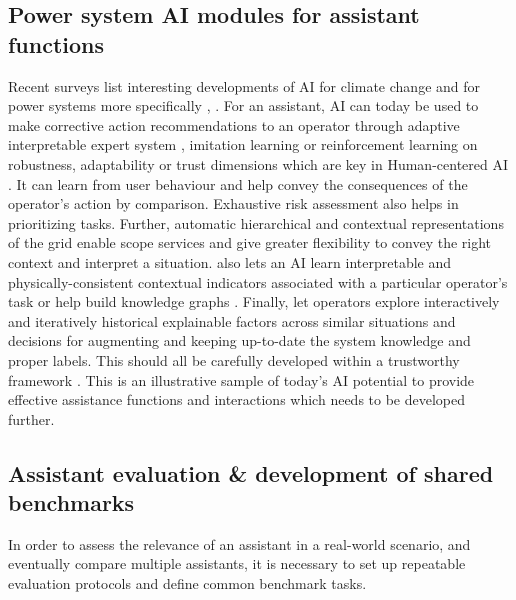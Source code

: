 \documentclass{IOS-Book-Article}
\begin{document}
\subsection{Power system AI modules for assistant functions}\label{sec:AIModules}
Recent surveys list interesting developments of AI for climate change \cite{rolnick2022tackling} and for power systems more specifically \cite{kezunovic2020big}, \cite{duchesne2020recent}. For an assistant, AI can today be used to make corrective action recommendations to an operator through adaptive interpretable expert system \cite{marot2018expert},  imitation learning \cite{donnot2017introducing} or reinforcement learning on robustness, adaptability or trust dimensions \cite{marot2021learning,l2rpn_with_trust} which are key in Human-centered AI \cite{shneiderman2020human}. It can learn from user behaviour and help convey the consequences of the operator's action by comparison. Exhaustive risk assessment \cite{donnot2018optimization} also helps in prioritizing tasks. Further, automatic hierarchical and contextual representations of the grid \cite{marot2018guided} enable scope services and give greater flexibility to convey the right context and interpret a situation. \cite{crochepierre2020interpretable} also lets an AI learn interpretable and physically-consistent contextual indicators associated with a particular operator's task or help build knowledge graphs \cite{huang2020knowledge}. Finally, \cite{marot2019interpreting,boudjeloud2016interactive,gkorou2020get} let operators explore interactively and iteratively historical explainable factors across similar situations and decisions for augmenting and keeping up-to-date the system knowledge and proper labels. This should all be carefully developed within a trustworthy framework \cite{stiasny2022closing}. This is an illustrative sample of today's AI potential \cite{Li18, Shi20} to provide effective assistance functions and interactions which needs to be developed further. 

\subsection{Assistant evaluation \& development of shared benchmarks}
 In order to assess the relevance of an assistant in a real-world scenario, and eventually compare multiple assistants, it is necessary to set up repeatable evaluation protocols and define common benchmark tasks.
 
\end{document}
